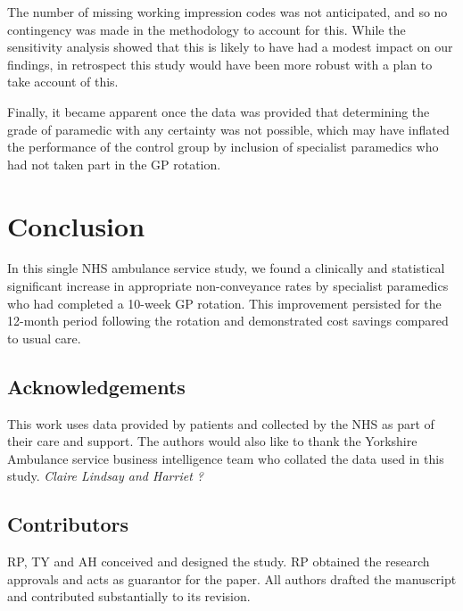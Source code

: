 \documentclass[
  a4paper,
  openany]{article}
\begin{document}
The number of missing working impression codes was not anticipated, and so no contingency was made in the methodology to account for this. While the sensitivity analysis showed that this is likely to have had a modest impact on our findings, in retrospect this study would have been more robust with a plan to take account of this.

Finally, it became apparent once the data was provided that determining the grade of paramedic with any certainty was not possible, which may have inflated the performance of the control group by inclusion of specialist paramedics who had not taken part in the GP rotation.

\hypertarget{conclusion-1}{%
\section*{Conclusion}\label{conclusion-1}}

In this single NHS ambulance service study, we found a clinically and statistical significant increase in appropriate non-conveyance rates by specialist paramedics who had completed a 10-week GP rotation. This improvement persisted for the 12-month period following the rotation and demonstrated cost savings compared to usual care.

\hypertarget{acknowledgements}{%
\subsection*{Acknowledgements}\label{acknowledgements}}

This work uses data provided by patients and collected by the NHS as part of their care and support. The authors would also like to thank the Yorkshire Ambulance service business intelligence team who collated the data used in this study.
\emph{Claire Lindsay and Harriet ?}

\hypertarget{contributors}{%
\subsection*{Contributors}\label{contributors}}

RP, TY and AH conceived and designed the study. RP obtained the research approvals and acts as guarantor for the paper. All authors drafted the manuscript and contributed substantially to its revision.
\end{document}
